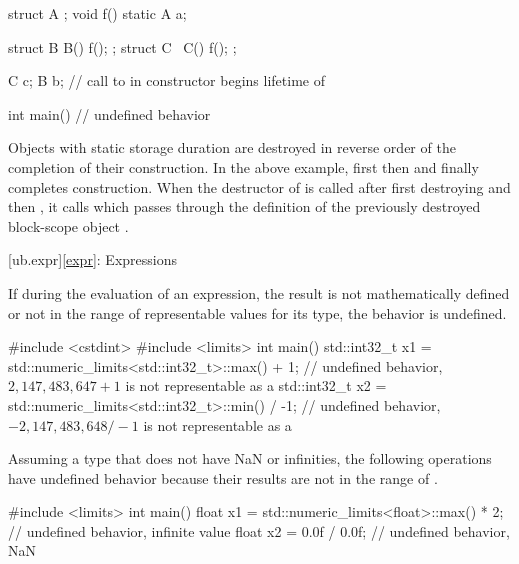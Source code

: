 \pnum
\begin{example}
\begin{codeblock}
struct A {};
void f() {
  static A a;
}

struct B {
  B() { f(); }
};
struct C {
  ~C() { f(); }
};

C c;
B b;    // call to  in constructor begins lifetime of 

int main() {}   // undefined behavior
\end{codeblock}
Objects with static storage duration
are destroyed in reverse order
of the completion
of their construction.
In the above example,
first  then  and finally 
completes construction.
When the destructor of  is called
after first destroying  and then ,
it calls  which
passes through the definition of
the previously destroyed
block-scope object .
\end{example}

[ub.expr]{\ref*{expr}: Expressions}


\pnum
If during the evaluation of an expression,
the result is not mathematically defined
or not in the range of representable values for its type,
the behavior is undefined.

\pnum
\begin{example}
\begin{codeblock}
#include <cstdint>
#include <limits>
int main() {
  std::int32_t x1 = std::numeric_limits<std::int32_t>::max() + 1;
        // undefined behavior, $2,147,483,647 + 1$ is not representable as a 
  std::int32_t x2 = std::numeric_limits<std::int32_t>::min() / -1;
        // undefined behavior, $-2,147,483,648 / -1$ is not representable as a 
}
\end{codeblock}
\end{example}

\begin{example}
Assuming a  type
that does not have
NaN or infinities,
the following operations have undefined behavior
because their results
are not in the range of .
\begin{codeblock}
#include <limits>
int main() {
  float x1 = std::numeric_limits<float>::max() * 2; // undefined behavior, infinite value
  float x2 = 0.0f / 0.0f;                           // undefined behavior, NaN
}
\end{codeblock}
\end{example}

